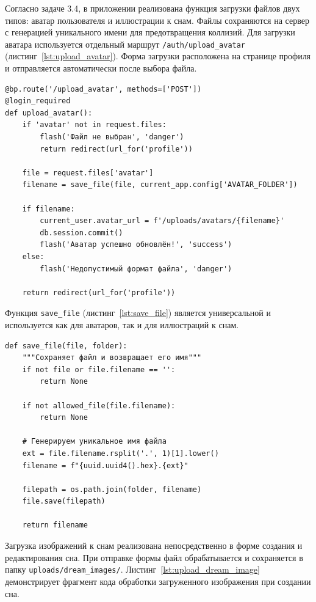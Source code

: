 \documentclass[14pt, a4paper]{extarticle}
\begin{document}
Согласно задаче 3.4, в приложении реализована функция загрузки файлов двух типов: аватар пользователя и иллюстрации к снам. Файлы сохраняются на сервер с генерацией уникального имени для предотвращения коллизий.
Для загрузки аватара используется отдельный маршрут \texttt{/auth/upload\_avatar} (листинг~\ref{lst:upload_avatar}). Форма загрузки расположена на странице профиля и отправляется автоматически после выбора файла.

\begin{lstlisting}[caption={Загрузка аватара пользователя}, label={lst:upload_avatar}]
@bp.route('/upload_avatar', methods=['POST'])
@login_required
def upload_avatar():
    if 'avatar' not in request.files:
        flash('Файл не выбран', 'danger')
        return redirect(url_for('profile'))

    file = request.files['avatar']
    filename = save_file(file, current_app.config['AVATAR_FOLDER'])

    if filename:
        current_user.avatar_url = f'/uploads/avatars/{filename}'
        db.session.commit()
        flash('Аватар успешно обновлён!', 'success')
    else:
        flash('Недопустимый формат файла', 'danger')

    return redirect(url_for('profile'))
\end{lstlisting}

Функция \texttt{save\_file} (листинг~\ref{lst:save_file}) является универсальной и используется как для аватаров, так и для иллюстраций к снам.

\begin{lstlisting}[caption={Универсальная функция сохранения файла}, label={lst:save_file}]
def save_file(file, folder):
    """Сохраняет файл и возвращает его имя"""
    if not file or file.filename == '':
        return None
    
    if not allowed_file(file.filename):
        return None
    
    # Генерируем уникальное имя файла
    ext = file.filename.rsplit('.', 1)[1].lower()
    filename = f"{uuid.uuid4().hex}.{ext}"
    
    filepath = os.path.join(folder, filename)
    file.save(filepath)
    
    return filename
\end{lstlisting}

Загрузка изображений к снам реализована непосредственно в форме создания и редактирования сна. При отправке формы файл обрабатывается и сохраняется в папку \texttt{uploads/dream\_images/}. Листинг~\ref{lst:upload_dream_image} демонстрирует фрагмент кода обработки загруженного изображения при создании сна.
\end{document}
